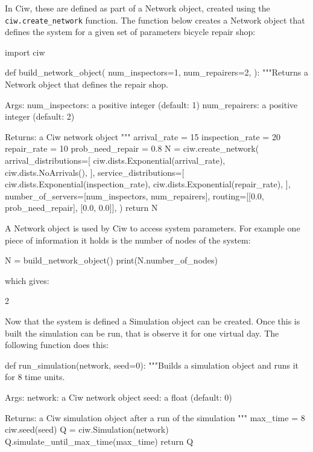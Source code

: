In Ciw, these are defined as part of a Network object, created using the
\texttt{ciw.create_network} function. The function below creates a
Network object that defines the system for a given set of parameters bicycle
repair shop:

\begin{pyin}
import ciw


def build_network_object(
    num_inspectors=1,
    num_repairers=2,
):
    """Returns a Network object that defines the repair shop.

    Args:
        num_inspectors: a positive integer (default: 1)
        num_repairers: a positive integer (default: 2)

    Returns:
        a Ciw network object
    """
    arrival_rate = 15
    inspection_rate = 20
    repair_rate = 10
    prob_need_repair = 0.8
    N = ciw.create_network(
        arrival_distributions=[
            ciw.dists.Exponential(arrival_rate),
            ciw.dists.NoArrivals(),
        ],
        service_distributions=[
            ciw.dists.Exponential(inspection_rate),
            ciw.dists.Exponential(repair_rate),
        ],
        number_of_servers=[num_inspectors, num_repairers],
        routing=[[0.0, prob_need_repair], [0.0, 0.0]],
    )
    return N
\end{pyin}

A Network object is used by Ciw to access system parameters. For example one
piece of information it holds is the number of nodes of the system:

\begin{pyin}
N = build_network_object()
print(N.number_of_nodes)
\end{pyin}

which gives:

\begin{pyout}
2
\end{pyout}

Now that the system is defined a Simulation object can be created.
Once this is built the simulation can be run, that is observe it for one
virtual day. The following function does this:

\begin{pyin}
def run_simulation(network, seed=0):
    """Builds a simulation object and runs it for 8 time units.

    Args:
        network: a Ciw network object
        seed: a float (default: 0)

    Returns:
        a Ciw simulation object after a run of the simulation
    """
    max_time = 8
    ciw.seed(seed)
    Q = ciw.Simulation(network)
    Q.simulate_until_max_time(max_time)
    return Q
\end{pyin}

